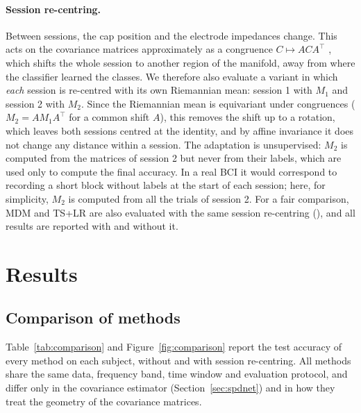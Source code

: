 \paragraph{Session re-centring.}
Between sessions, the cap position and the electrode impedances change. This acts on the covariance matrices approximately as a congruence $C \mapsto A C A^\top$ \citep{zanini2018}, which shifts the whole session to another region of the manifold, away from where the classifier learned the classes. We therefore also evaluate a variant in which \emph{each} session is re-centred with its own Riemannian mean: session 1 with $M_1$ and session 2 with $M_2$. Since the Riemannian mean is equivariant under congruences ($M_2 = A M_1 A^\top$ for a common shift $A$), this removes the shift up to a rotation, which leaves both sessions centred at the identity, and by affine invariance it does not change any distance within a session. The adaptation is unsupervised: $M_2$ is computed from the matrices of session 2 but never from their labels, which are used only to compute the final accuracy. In a real BCI it would correspond to recording a short block without labels at the start of each session; here, for simplicity, $M_2$ is computed from all the trials of session 2. For a fair comparison, MDM and TS+LR are also evaluated with the same session re-centring (), and all results are reported with and without it.

\section{Results}
\label{sec:results}

\subsection{Comparison of methods}
\label{sec:comparison}

Table~\ref{tab:comparison} and Figure~\ref{fig:comparison} report the test accuracy of every method on each subject, without and with session re-centring. All methods share the same data, frequency band, time window and evaluation protocol, and differ only in the covariance estimator (Section~\ref{sec:spdnet}) and in how they treat the geometry of the covariance matrices.



